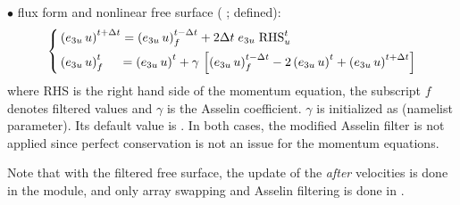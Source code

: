 \documentclass[../tex_main/NEMO_manual]{subfiles}
\begin{document}
$\bullet$ flux form and nonlinear free surface ( ;  defined):
\begin{equation} \label{eq:dynnxt_flux}
\left\{   \begin{aligned}
&\left(e_{3u}\,u\right)^{t+\Delta t} = \left(e_{3u}\,u\right)_f^{t-\Delta t} + 2\Delta t \; e_{3u} \;\text{RHS}_u^t  	\\
&\left(e_{3u}\,u\right)_f^t \;\quad = \left(e_{3u}\,u\right)^t
  +\gamma \,\left[ {\left(e_{3u}\,u\right)_f^{t-\Delta t} -2\left(e_{3u}\,u\right)^t+\left(e_{3u}\,u\right)^{t+\Delta t}} \right]
\end{aligned}   \right.
\end{equation} 
where RHS is the right hand side of the momentum equation, the subscript $f$ 
denotes filtered values and $\gamma$ is the Asselin coefficient. $\gamma$ is 
initialized as  (namelist parameter). Its default value is .
In both cases, the modified Asselin filter is not applied since perfect conservation 
is not an issue for the momentum equations.

Note that with the filtered free surface, the update of the \textit{after} velocities 
is done in the  module, and only array swapping
and Asselin filtering is done in .

\end{document}
